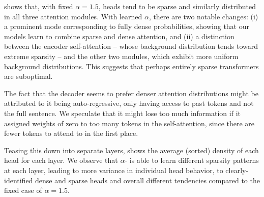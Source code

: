 \begin{sloppypar}
     shows that, with fixed $\alpha=1.5$, heads
    tend to be sparse and similarly distributed in all three attention
    modules. With learned $\alpha$, there are two notable changes: (i) a
    prominent mode corresponding to fully dense probabilities, showing
    that our models learn to combine sparse and dense attention, and (ii)
    a distinction between the encoder self-attention -- whose background
    distribution tends toward extreme sparsity -- and the other two
    modules, which exhibit more uniform background distributions. This
    suggests that perhaps entirely sparse transformers are suboptimal.
\end{sloppypar}

The fact that the decoder seems to prefer denser attention
distributions might be attributed to it being auto-regressive, only
having access to past tokens and not the full sentence. We speculate
that it might lose too much information if it assigned weights of
zero to too many tokens in the self-attention, since there are fewer
tokens to attend to in the first place.

Teasing this down into separate layers,
 shows the average (sorted) density of
each head for each layer. We observe that $\alpha$-\entmaxtext{} is
able to learn different sparsity patterns at each layer, leading to
more variance in individual head behavior, to clearly-identified
dense and sparse heads and overall different tendencies compared
to the fixed case of $\alpha=1.5$.

